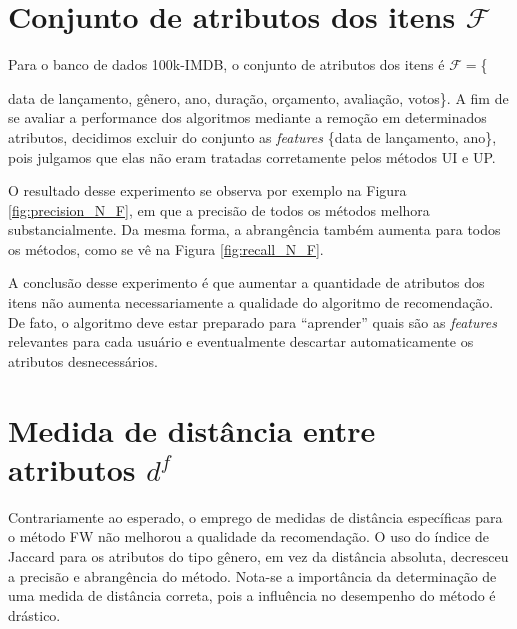 
\section{Conjunto de atributos dos itens
 $\mathcal{F}$} %
\label{sec:conjunto_de_atributos_dos_itens_}

Para o banco de dados 100k-IMDB, o conjunto de atributos dos itens é $\mathcal{F}=$\{{data de lançamento, gênero, ano, duração, orçamento, avaliação, votos\}. A fim de se avaliar a performance dos algoritmos mediante a remoção em determinados atributos, decidimos excluir do conjunto as \textit{features} \{data de lançamento, ano\}, pois julgamos que elas não eram tratadas corretamente pelos métodos UI e UP. 

O resultado desse experimento se observa por exemplo na Figura \ref{fig:precision_N_F}, em que a precisão de todos os métodos melhora substancialmente. Da mesma forma, a abrangência também aumenta para todos os métodos, como se vê na Figura \ref{fig:recall_N_F}.

A conclusão desse experimento é que aumentar a quantidade de atributos dos itens não aumenta necessariamente a qualidade do algoritmo de recomendação. De fato, o algoritmo deve estar preparado para ``aprender'' quais são as \textit{features} relevantes para cada usuário e eventualmente descartar automaticamente os atributos desnecessários.

\section{Medida de distância entre atributos $d^f$} %
\label{sec:medida_de_dist_ncia_entre_atributos_}

Contrariamente ao esperado, o emprego de medidas de distância específicas para o método FW não melhorou a qualidade da recomendação. O uso do índice de Jaccard para os atributos do tipo gênero, em vez da distância absoluta, decresceu a precisão e abrangência do método. Nota-se a importância da determinação de uma medida de distância correta, pois a influência no desempenho do método é drástico.


}

